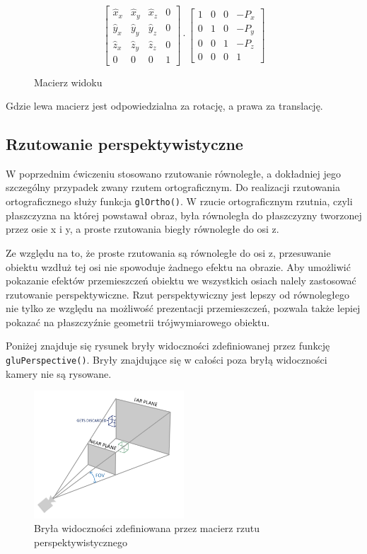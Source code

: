 \documentclass[a4paper]{article}
\begin{document}
\begin{figure}[H]
    \[
        \begin{bmatrix}
            \hat{x}_x & \hat{x}_y & \hat{x}_z & 0 \\
            \hat{y}_x & \hat{y}_y & \hat{y}_z & 0 \\
            \hat{z}_x & \hat{z}_y & \hat{z}_z & 0 \\
            0         & 0         & 0         & 1
        \end{bmatrix}
        \cdot
        \begin{bmatrix}
            1 & 0 & 0 & -P_x \\
            0 & 1 & 0 & -P_y \\
            0 & 0 & 1 & -P_z \\
            0 & 0 & 0 & 1
        \end{bmatrix}
    \]
    \caption{Macierz widoku}
\end{figure}

Gdzie lewa macierz jest odpowiedzialna za rotację, a prawa za translację.

\subsection{Rzutowanie perspektywistyczne}
W poprzednim ćwiczeniu stosowano rzutowanie równoległe, a dokładniej jego
szczególny przypadek zwany rzutem ortograficznym. Do realizacji rzutowania
ortograficznego służy funkcja \verb|glOrtho()|. W rzucie ortograficznym rzutnia,
czyli płaszczyzna na której powstawał obraz, była równoległa do płaszczyzny
tworzonej przez osie x i y, a proste rzutowania biegły równoległe do osi z.

Ze względu na to, że proste rzutowania są równoległe do osi z, przesuwanie
obiektu wzdłuż tej osi nie spowoduje żadnego efektu na obrazie. Aby umożliwić
pokazanie efektów przemieszczeń obiektu we wszystkich osiach nalely zastosować
rzutowanie perspektywiczne. Rzut perspektywiczny jest lepszy od równoległego nie
tylko ze względu na możliwość prezentacji przemieszczeń, pozwala także lepiej
pokazać na płaszczyźnie geometrii trójwymiarowego obiektu.

Poniżej znajduje się rysunek bryły widoczności zdefiniowanej przez funkcję
\verb|gluPerspective()|. Bryły znajdujące się w całości poza bryłą widoczności
kamery nie są rysowane.

\begin{figure}[H]
    \centering
    \includegraphics[width=0.5\textwidth]{perspective_frustum}
    \caption{Bryła widoczności zdefiniowana przez macierz rzutu perspektywistycznego}
\end{figure}
\end{document}

